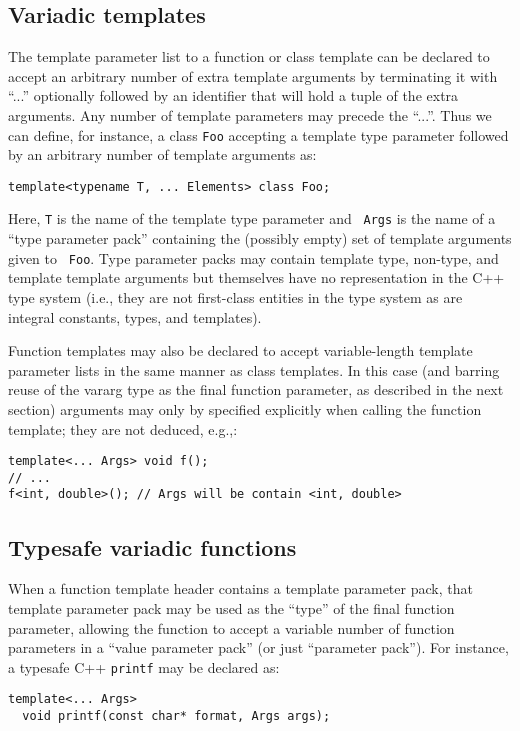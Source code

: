 \documentclass{article}
\begin{document}
\subsection{Variadic templates}
\par The template parameter list to a function or class template can
be declared to accept an arbitrary number of extra template arguments
by terminating it with ``...'' optionally followed by an identifier
that will hold a tuple of the extra arguments. Any number of template
parameters may precede the ``...''. Thus we can define, for instance,
a class {\tt Foo} accepting a template type parameter followed by an
arbitrary number of template arguments as:
\begin{verbatim}
template<typename T, ... Elements> class Foo;
\end{verbatim}

Here, {\tt T} is the name of the template type parameter and {\tt
  Args} is the name of a ``type parameter pack'' containing
the (possibly empty) set of template arguments given to {\tt
  Foo}. Type parameter packs may contain template type, non-type, and
template template arguments but themselves have no representation in
the C++ type system (i.e., they are not first-class entities in the
type system as are integral constants, types, and templates).

Function templates may also be declared to accept variable-length
template parameter lists in the same manner as class templates. In
this case (and barring reuse of the vararg type as the final function
parameter, as described in the next section) arguments may only by
specified explicitly when calling the function template; they are not
deduced, e.g.,:

\begin{verbatim}
template<... Args> void f();
// ... 
f<int, double>(); // Args will be contain <int, double>
\end{verbatim}

\subsection{Typesafe variadic functions}
When a function template header contains a template parameter pack,
that template parameter pack may be used as the ``type'' of the final
function parameter, allowing the function to accept a variable number
of function parameters in a ``value parameter pack'' (or just
``parameter pack''). For instance, a typesafe C++ {\tt printf} may
be declared as:
\begin{verbatim}
template<... Args>
  void printf(const char* format, Args args);
\end{verbatim}
\end{document}
